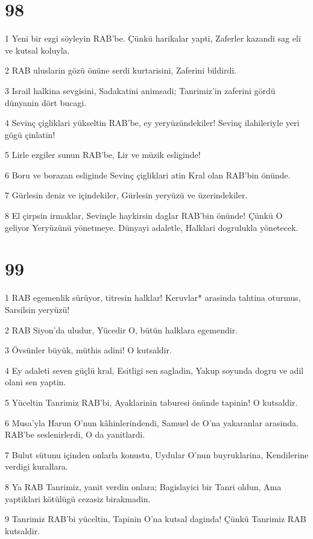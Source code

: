 \chapter{98}

\par 1 Yeni bir ezgi söyleyin RAB'be. Çünkü harikalar yapti, Zaferler kazandi sag eli ve kutsal koluyla.
\par 2 RAB uluslarin gözü önüne serdi kurtarisini, Zaferini bildirdi.
\par 3 Israil halkina sevgisini, Sadakatini animsadi; Tanrimiz'in zaferini gördü dünyanin dört bucagi.
\par 4 Sevinç çigliklari yükseltin RAB'be, ey yeryüzündekiler! Sevinç ilahileriyle yeri gögü çinlatin!
\par 5 Lirle ezgiler sunun RAB'be, Lir ve müzik esliginde!
\par 6 Boru ve borazan esliginde Sevinç çigliklari atin Kral olan RAB'bin önünde.
\par 7 Gürlesin deniz ve içindekiler, Gürlesin yeryüzü ve üzerindekiler.
\par 8 El çirpsin irmaklar, Sevinçle haykirsin daglar RAB'bin önünde! Çünkü O geliyor Yeryüzünü yönetmeye. Dünyayi adaletle, Halklari dogrulukla yönetecek.

\chapter{99}

\par 1 RAB egemenlik sürüyor, titresin halklar! Keruvlar* arasinda tahtina oturmus, Sarsilsin yeryüzü!
\par 2 RAB Siyon'da uludur, Yücedir O, bütün halklara egemendir.
\par 3 Övsünler büyük, müthis adini! O kutsaldir.
\par 4 Ey adaleti seven güçlü kral, Esitligi sen sagladin, Yakup soyunda dogru ve adil olani sen yaptin.
\par 5 Yüceltin Tanrimiz RAB'bi, Ayaklarinin taburesi önünde tapinin! O kutsaldir.
\par 6 Musa'yla Harun O'nun kâhinlerindendi, Samuel de O'na yakaranlar arasinda. RAB'be seslenirlerdi, O da yanitlardi.
\par 7 Bulut sütunu içinden onlarla konustu, Uydular O'nun buyruklarina, Kendilerine verdigi kurallara.
\par 8 Ya RAB Tanrimiz, yanit verdin onlara; Bagislayici bir Tanri oldun, Ama yaptiklari kötülügü cezasiz birakmadin.
\par 9 Tanrimiz RAB'bi yüceltin, Tapinin O'na kutsal daginda! Çünkü Tanrimiz RAB kutsaldir.


